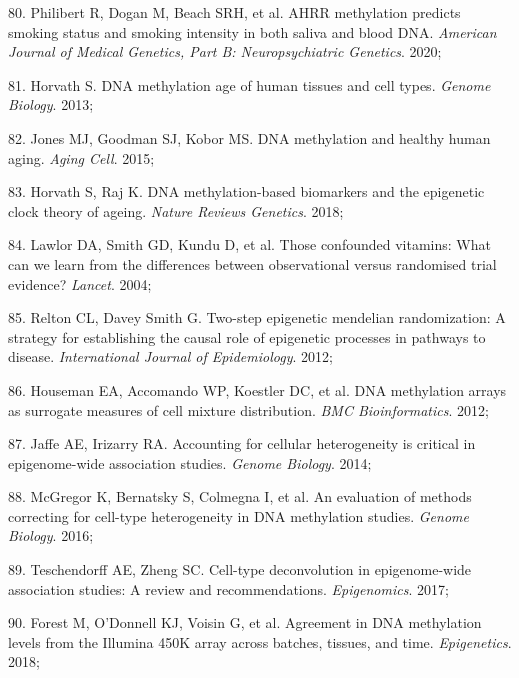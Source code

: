 \documentclass[11pt,twoside]{bristolthesis}
\newenvironment{cslreferences}%
  {}%
  {\par}
\begin{document}
\begin{cslreferences}
\leavevmode\hypertarget{ref-Philibert2020}{}%
80. Philibert R, Dogan M, Beach SRH, et al. AHRR methylation predicts smoking status and smoking intensity in both saliva and blood DNA. \emph{American Journal of Medical Genetics, Part B: Neuropsychiatric Genetics}. 2020;

\leavevmode\hypertarget{ref-Horvath2013}{}%
81. Horvath S. DNA methylation age of human tissues and cell types. \emph{Genome Biology}. 2013;

\leavevmode\hypertarget{ref-Jones2015}{}%
82. Jones MJ, Goodman SJ, Kobor MS. DNA methylation and healthy human aging. \emph{Aging Cell}. 2015;

\leavevmode\hypertarget{ref-Horvath2018}{}%
83. Horvath S, Raj K. DNA methylation-based biomarkers and the epigenetic clock theory of ageing. \emph{Nature Reviews Genetics}. 2018;

\leavevmode\hypertarget{ref-Lawlor2004}{}%
84. Lawlor DA, Smith GD, Kundu D, et al. Those confounded vitamins: What can we learn from the differences between observational versus randomised trial evidence? \emph{Lancet}. 2004;

\leavevmode\hypertarget{ref-Relton2012}{}%
85. Relton CL, Davey Smith G. Two-step epigenetic mendelian randomization: A strategy for establishing the causal role of epigenetic processes in pathways to disease. \emph{International Journal of Epidemiology}. 2012;

\leavevmode\hypertarget{ref-Houseman2012}{}%
86. Houseman EA, Accomando WP, Koestler DC, et al. DNA methylation arrays as surrogate measures of cell mixture distribution. \emph{BMC Bioinformatics}. 2012;

\leavevmode\hypertarget{ref-Jaffe2014}{}%
87. Jaffe AE, Irizarry RA. Accounting for cellular heterogeneity is critical in epigenome-wide association studies. \emph{Genome Biology}. 2014;

\leavevmode\hypertarget{ref-McGregor2016}{}%
88. McGregor K, Bernatsky S, Colmegna I, et al. An evaluation of methods correcting for cell-type heterogeneity in DNA methylation studies. \emph{Genome Biology}. 2016;

\leavevmode\hypertarget{ref-Teschendorff2017}{}%
89. Teschendorff AE, Zheng SC. Cell-type deconvolution in epigenome-wide association studies: A review and recommendations. \emph{Epigenomics}. 2017;

\leavevmode\hypertarget{ref-Forest2018}{}%
90. Forest M, O'Donnell KJ, Voisin G, et al. Agreement in DNA methylation levels from the Illumina 450K array across batches, tissues, and time. \emph{Epigenetics}. 2018;


\end{cslreferences}
\end{document}
